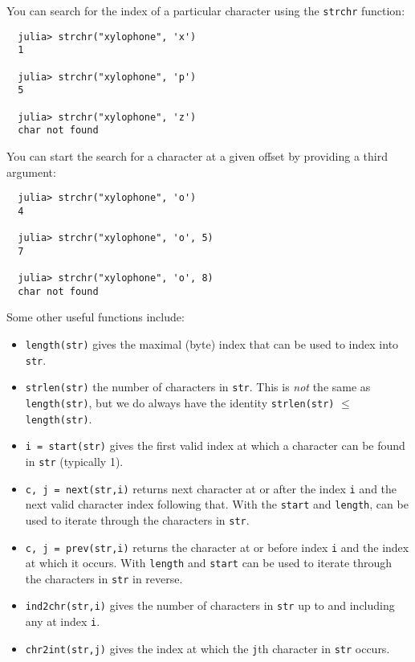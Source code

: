 \documentclass{article}
\begin{document}
You can search for the index of a particular character using the \verb|strchr| function:
\begin{verbatim}
  julia> strchr("xylophone", 'x')
  1

  julia> strchr("xylophone", 'p')
  5

  julia> strchr("xylophone", 'z')
  char not found
\end{verbatim}
You can start the search for a character at a given offset by providing a third argument:
\begin{verbatim}
  julia> strchr("xylophone", 'o')
  4

  julia> strchr("xylophone", 'o', 5)
  7

  julia> strchr("xylophone", 'o', 8)
  char not found
\end{verbatim}
Some other useful functions include:
\begin{itemize}
\item \verb|length(str)| gives the maximal (byte) index that can be used to index into \verb|str|.

\item \verb|strlen(str)| the number of characters in \verb|str|.
This is \emph{not} the same as \verb|length(str)|, but we do always have the identity \verb|strlen(str)| $\le$ \verb|length(str)|.

\item \verb|i = start(str)| gives the first valid index at which a character can be found in \verb|str| (typically 1).

\item \verb|c, j = next(str,i)| returns next character at or after the index \verb|i| and the next valid character index following that.
With the \verb|start| and \verb|length|, can be used to iterate through the characters in \verb|str|.


\item \verb|c, j = prev(str,i)| returns the character at or before index \verb|i| and the index at which it occurs.
With \verb|length| and \verb|start| can be used to iterate through the characters in \verb|str| in reverse.

\item \verb|ind2chr(str,i)| gives the number of characters in \verb|str| up to and including any at index \verb|i|.

\item \verb|chr2int(str,j)| gives the index at which the \verb|j|th character in \verb|str| occurs.
\end{itemize}
\end{document}
